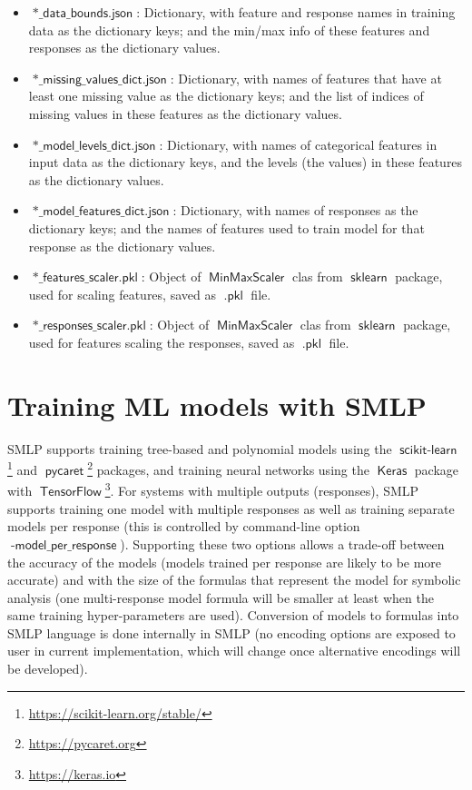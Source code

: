 \documentclass[a4paper,parskip=half]{article} %
\newcommand*\option[1]{\operatorname{\mathsf{#1}}} %
\newcommand*\suffix[1]{\operatorname{\mathsf{#1}}} %
\newcommand*\package[1]{\operatorname{\mathsf{#1}}} %
\begin{document}
\begin{itemize}
\item $\suffix{*\_data\_bounds.json}$: Dictionary, with feature and response names in training data as the dictionary keys; 
and the min/max info of these features and responses as the dictionary values. 
\item $\suffix{*\_missing\_values\_dict.json}$: Dictionary, with names of features that have at least one missing value as the 
dictionary keys; and the list of indices of missing values in these features  as the dictionary values.
\item $\suffix{*\_model\_levels\_dict.json}$: Dictionary, with names of categorical features in input data as the dictionary 
keys, and the levels (the values) in these features as the dictionary values.
\item $\suffix{*\_model\_features\_dict.json}$: Dictionary, with names of responses as the dictionary keys; and the names of
features used to train model for that response as the dictionary values.
\item $\suffix{*\_features\_scaler.pkl}$: Object of $\option{MinMaxScaler}$ clas from $\package{sklearn}$ package, 
used for scaling features, saved as $\suffix{.pkl}$ file.
\item $\suffix{*\_responses\_scaler.pkl}$:  Object of $\option{MinMaxScaler}$ clas from $\package{sklearn}$ package, 
used for features scaling the responses, saved as $\suffix{.pkl}$ file. 
\end{itemize}



\section{Training ML models with SMLP}\label{sec:models}

SMLP supports training tree-based and polynomial models using the $\package{scikit-learn}$\footnote{\url{https://scikit-learn.org/stable/}} 
and $\package{pycaret}$\footnote{\url{https://pycaret.org}} packages, and training neural networks using the $\package{Keras}$ package 
with $\package{TensorFlow}$\footnote{\url{https://keras.io}}. For systems with multiple outputs (responses), SMLP supports training 
one model with multiple responses as well as training separate models per response  (this is controlled by command-line option 
$\option{-model\_per\_response}$). Supporting these two options allows a trade-off between the accuracy 
of the models (models trained per response are likely to be more accurate) and with the size of the formulas that represent the model for 
symbolic analysis (one multi-response model formula will be smaller at least when the same training hyper-parameters are used). 
Conversion of models to formulas into SMLP language is done internally in SMLP (no encoding options are exposed to user in current 
implementation, which will change once alternative encodings will be developed).
\end{document}
